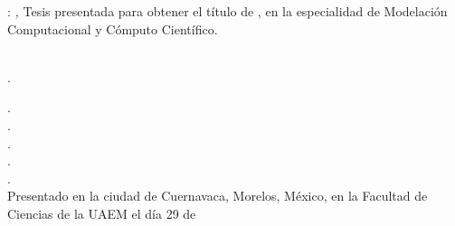 \thispagestyle{empty}

\hfill

\vfill

\noindent\myName: \textit{\myTitle,} %
Tesis presentada para obtener el título de \myDegree, en la especialidad de Modelaci\'on Computacional y C\'omputo Cient\'ifico.\\
\medskip
\\
\noindent {}

\medskip

\noindent \textsc{\myProf}. 

\medskip
\noindent {}

\medskip

\noindent \textsc{\myFirstRevisor}. \\
\noindent \textsc{\mySecondRevisor}. \\
\noindent \textsc{\myThirdRevisor}. \\
\noindent \textsc{\myProf}. \\
\noindent \textsc{\myFourthRevisor}. \\

\noindent Presentado en la ciudad de Cuernavaca, Morelos, México, en la Facultad de Ciencias de la UAEM el día 29 de \myTime

%
%
%
%
%
